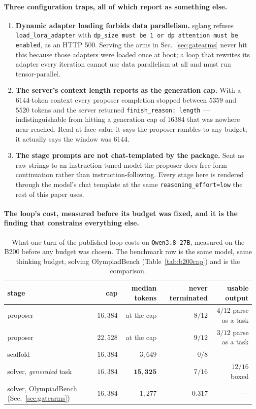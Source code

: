 \paragraph{Three configuration traps, all of which report as something else.}
\begin{enumerate}
\item \textbf{Dynamic adapter loading forbids data parallelism.} sglang refuses
  \texttt{load\_lora\_adapter} with \texttt{dp\_size must be 1 or dp attention must be
  enabled}, as an HTTP 500. Serving the arms in Sec.~\ref{sec:gatearms} never hit this because
  those adapters were loaded once at boot; a loop that rewrites its adapter every iteration
  cannot use data parallelism at all and must run tensor-parallel.
\item \textbf{The server's context length reports as the generation cap.} With a
  $6144$-token context every proposer completion stopped between $5359$ and $5520$ tokens and
  the server returned \texttt{finish\_reason: length} --- indistinguishable from hitting a
  generation cap of $16384$ that was nowhere near reached. Read at face value it says the
  proposer rambles to any budget; it actually says the window was $6144$.
\item \textbf{The stage prompts are not chat-templated by the package.} Sent as raw strings to
  an instruction-tuned model the proposer does free-form continuation rather than
  instruction-following. Every stage here is rendered through the model's chat template at the
  same \texttt{reasoning\_effort=low} the rest of this paper uses.
\end{enumerate}

\paragraph{The loop's cost, measured before its budget was fixed, and it is the finding that
constrains everything else.}

\begin{table}[t]
\centering\small
\caption{What one turn of the published loop costs on \texttt{Qwen3.8-27B}, measured on the
B200 before any budget was chosen. The benchmark row is the same model, same thinking budget,
solving OlympiadBench (Table~\ref{tab:b200cap}) and is the comparison.}
\label{tab:ornithcost}
\begin{tabular}{lrrrr}
\toprule
stage & cap & median tokens & never terminated & usable output \\
\midrule
proposer            & $16{,}384$ & at the cap & $8/12$  & $4/12$ parse as a task \\
proposer            & $22{,}528$ & at the cap & $9/12$  & $3/12$ parse as a task \\
scaffold            & $16{,}384$ & $3{,}649$  & $0/8$   & --- \\
solver, \emph{generated} task & $16{,}384$ & $\mathbf{15{,}325}$ & $7/16$ & $12/16$ boxed \\
\addlinespace
solver, OlympiadBench (Sec.~\ref{sec:gatearms}) & $16{,}384$ & $1{,}277$ & $0.317$ & --- \\
\bottomrule
\end{tabular}
\end{table}

